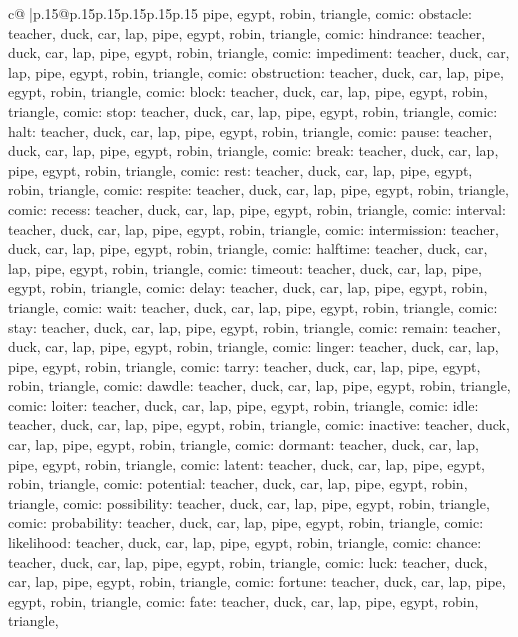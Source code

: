 \documentclass{article}
\begin{document}
{\begin{supertabular}{c@{$\;$}|p{.15\linewidth}@{}p{.15\linewidth}p{.15\linewidth}p{.15\linewidth}p{.15\linewidth}p{.15\linewidth}}
{{{pipe, egypt, robin, triangle, comic\n\nCLUE: obstacle\nTARGETS: teacher, duck, car, lap, pipe, egypt, robin, triangle, comic\n\nCLUE: hindrance\nTARGETS: teacher, duck, car, lap, pipe, egypt, robin, triangle, comic\n\nCLUE: impediment\nTARGETS: teacher, duck, car, lap, pipe, egypt, robin, triangle, comic\n\nCLUE: obstruction\nTARGETS: teacher, duck, car, lap, pipe, egypt, robin, triangle, comic\n\nCLUE: block\nTARGETS: teacher, duck, car, lap, pipe, egypt, robin, triangle, comic\n\nCLUE: stop\nTARGETS: teacher, duck, car, lap, pipe, egypt, robin, triangle, comic\n\nCLUE: halt\nTARGETS: teacher, duck, car, lap, pipe, egypt, robin, triangle, comic\n\nCLUE: pause\nTARGETS: teacher, duck, car, lap, pipe, egypt, robin, triangle, comic\n\nCLUE: break\nTARGETS: teacher, duck, car, lap, pipe, egypt, robin, triangle, comic\n\nCLUE: rest\nTARGETS: teacher, duck, car, lap, pipe, egypt, robin, triangle, comic\n\nCLUE: respite\nTARGETS: teacher, duck, car, lap, pipe, egypt, robin, triangle, comic\n\nCLUE: recess\nTARGETS: teacher, duck, car, lap, pipe, egypt, robin, triangle, comic\n\nCLUE: interval\nTARGETS: teacher, duck, car, lap, pipe, egypt, robin, triangle, comic\n\nCLUE: intermission\nTARGETS: teacher, duck, car, lap, pipe, egypt, robin, triangle, comic\n\nCLUE: halftime\nTARGETS: teacher, duck, car, lap, pipe, egypt, robin, triangle, comic\n\nCLUE: timeout\nTARGETS: teacher, duck, car, lap, pipe, egypt, robin, triangle, comic\n\nCLUE: delay\nTARGETS: teacher, duck, car, lap, pipe, egypt, robin, triangle, comic\n\nCLUE: wait\nTARGETS: teacher, duck, car, lap, pipe, egypt, robin, triangle, comic\n\nCLUE: stay\nTARGETS: teacher, duck, car, lap, pipe, egypt, robin, triangle, comic\n\nCLUE: remain\nTARGETS: teacher, duck, car, lap, pipe, egypt, robin, triangle, comic\n\nCLUE: linger\nTARGETS: teacher, duck, car, lap, pipe, egypt, robin, triangle, comic\n\nCLUE: tarry\nTARGETS: teacher, duck, car, lap, pipe, egypt, robin, triangle, comic\n\nCLUE: dawdle\nTARGETS: teacher, duck, car, lap, pipe, egypt, robin, triangle, comic\n\nCLUE: loiter\nTARGETS: teacher, duck, car, lap, pipe, egypt, robin, triangle, comic\n\nCLUE: idle\nTARGETS: teacher, duck, car, lap, pipe, egypt, robin, triangle, comic\n\nCLUE: inactive\nTARGETS: teacher, duck, car, lap, pipe, egypt, robin, triangle, comic\n\nCLUE: dormant\nTARGETS: teacher, duck, car, lap, pipe, egypt, robin, triangle, comic\n\nCLUE: latent\nTARGETS: teacher, duck, car, lap, pipe, egypt, robin, triangle, comic\n\nCLUE: potential\nTARGETS: teacher, duck, car, lap, pipe, egypt, robin, triangle, comic\n\nCLUE: possibility\nTARGETS: teacher, duck, car, lap, pipe, egypt, robin, triangle, comic\n\nCLUE: probability\nTARGETS: teacher, duck, car, lap, pipe, egypt, robin, triangle, comic\n\nCLUE: likelihood\nTARGETS: teacher, duck, car, lap, pipe, egypt, robin, triangle, comic\n\nCLUE: chance\nTARGETS: teacher, duck, car, lap, pipe, egypt, robin, triangle, comic\n\nCLUE: luck\nTARGETS: teacher, duck, car, lap, pipe, egypt, robin, triangle, comic\n\nCLUE: fortune\nTARGETS: teacher, duck, car, lap, pipe, egypt, robin, triangle, comic\n\nCLUE: fate\nTARGETS: teacher, duck, car, lap, pipe, egypt, robin, triangle, }}}
\end{supertabular}}
\end{document}
